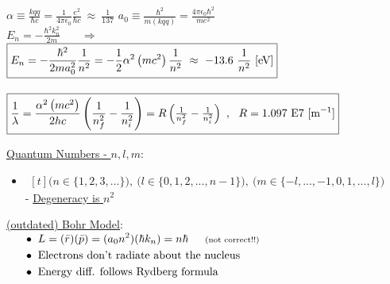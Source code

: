 \documentclass[12pt]{article}
\begin{document}
\vspace{25pt} \noindent
\( \boxed{ \alpha \equiv \frac{kqq}{\hbar c} 
    = \frac{1}{4 \pi \epsilon_0} \frac{e^2}{\hbar c} \ \approx \ \frac{1}{137} } \)
\hspace{1cm}
\( \boxed{ a_0 \equiv \frac{\hbar^2}{m (kqq)} = \frac{4 \pi \epsilon_0 \hbar^2}{m e^2} } \)\\[15pt]
\( E_n = -\frac{\hbar^2 k^2_n}{2m} \) 
\ \ \ \(\Rightarrow\) \ \ \ 
\( \begin{aligned}[t]
    \Aboxed{ &E_n = - \frac{\hbar^2}{2m a_0^2} \frac{1}{n^2}
        = - \frac{1}{2} \alpha^2 \left( m c^2 \right) \dfrac{1}{n^2}
        \ \approx \ -13.6 \ \dfrac{1}{n^2} \ [\text{eV}] }\\[10pt]
    \Aboxed{ &\frac{1}{\lambda} = \frac{\alpha^2 \left( m c^2 \right) }{2 h c}
        \left( \dfrac{1}{n_f^2} - \dfrac{1}{n_i^2} \right)
        = R \left( \tfrac{1}{n_f^2} - \tfrac{1}{n_i^2} \right) 
        \ , \ \ R = 1.097 \ \text{E} 7 \ [\text{m}^{-1}] }
\end{aligned} \)

\vspace{20pt} \noindent
\underline{Quantum Numbers - \(n,l,m\)}:
\begin{itemize}
\item \( \begin{gathered}[t]
        \Big( n \in \{ 1, 2, 3, ... \} \Big), \ 
        \Big( l \in \{ 0, 1, 2, ..., n-1 \} \Big), \
        \Big( m \in \{ -l, ..., -1, 0, 1, ..., l \} \Big)
    \end{gathered} \)\\[10pt]
    - \underline{Degeneracy is \(n^2\)}
\end{itemize}      

\vspace{10pt}\noindent
\underline{(outdated) Bohr Model}:\\[10pt]
\(\begin{aligned}
    \indent &\bullet \ L = ( \bar{r} ) ( \bar{p} ) = (a_0 n^2) (\hbar k_n) 
        = n\hbar \indent \text{\scriptsize(not correct!!)}\\
    \indent &\bullet \ \text{Electrons don't radiate about the nucleus}\\
    \indent &\bullet \ \text{Energy diff. follows Rydberg formula}
\end{aligned}\)

\end{document}
